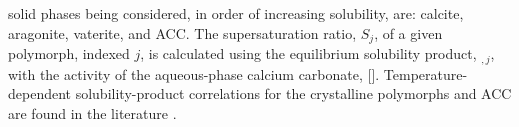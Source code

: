 \documentclass[preprint,3p,a4paper,times,12pt,authoryear]{elsarticle}
\begin{document}



  solid phases being considered, in order of increasing solubility, are: calcite, aragonite, vaterite, and ACC. The supersaturation ratio, $S_j$, of a given  polymorph, indexed $j$, is calculated using the equilibrium solubility product, $_{,j}$, with the activity of the aqueous-phase calcium carbonate, [].
Temperature-dependent solubility-product correlations for the crystalline polymorphs and ACC are found in the literature \citep{Brecevic1989,Plummer1982}. 
\end{document}
